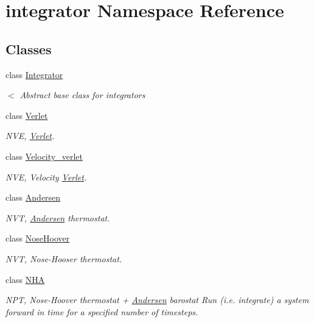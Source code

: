 \hypertarget{namespaceintegrator}{\section{integrator Namespace Reference}
\label{namespaceintegrator}
}
\subsection*{Classes}
\begin{DoxyCompactItemize}
\item 
class \hyperlink{classintegrator_1_1Integrator}{Integrator}
\begin{DoxyCompactList}\small\item\em $<$ Abstract base class for integrators \end{DoxyCompactList}\item 
class \hyperlink{classintegrator_1_1Verlet}{Verlet}
\begin{DoxyCompactList}\small\item\em N\-V\-E, \hyperlink{classintegrator_1_1Verlet}{Verlet}. \end{DoxyCompactList}\item 
class \hyperlink{classintegrator_1_1Velocity__verlet}{Velocity\-\_\-verlet}
\begin{DoxyCompactList}\small\item\em N\-V\-E, Velocity \hyperlink{classintegrator_1_1Verlet}{Verlet}. \end{DoxyCompactList}\item 
class \hyperlink{classintegrator_1_1Andersen}{Andersen}
\begin{DoxyCompactList}\small\item\em N\-V\-T, \hyperlink{classintegrator_1_1Andersen}{Andersen} thermostat. \end{DoxyCompactList}\item 
class \hyperlink{classintegrator_1_1NoseHoover}{Nose\-Hoover}
\begin{DoxyCompactList}\small\item\em N\-V\-T, Nose-\/\-Hooser thermostat. \end{DoxyCompactList}\item 
class \hyperlink{classintegrator_1_1NHA}{N\-H\-A}
\begin{DoxyCompactList}\small\item\em N\-P\-T, Nose-\/\-Hoover thermostat + \hyperlink{classintegrator_1_1Andersen}{Andersen} barostat Run (i.\-e. integrate) a system forward in time for a specified number of timesteps. \end{DoxyCompactList}\end{DoxyCompactItemize}
